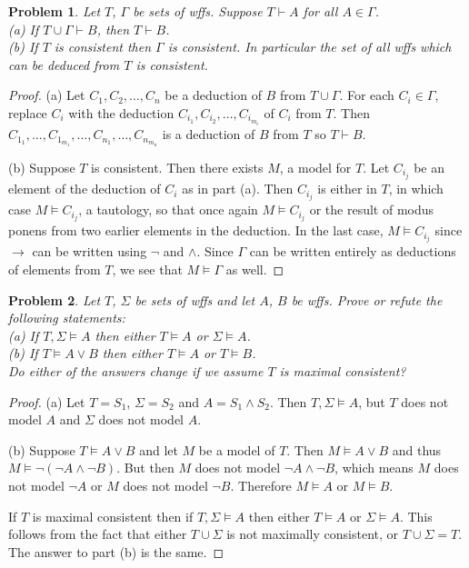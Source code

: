 \documentclass{article}
\newtheorem{problem}{Problem}
\begin{document}
\begin{problem}
Let $T$, $\Gamma$ be sets of wffs. Suppose $T \vdash A$ for all $A \in \Gamma$.\\
(a) If $T \cup \Gamma \vdash B$, then $T \vdash B$.\\
(b) If $T$ is consistent then $\Gamma$ is consistent. In particular the set of all wffs which can be deduced from $T$ is consistent.
\end{problem}
\begin{proof}
(a) Let $C_1, C_2, \dots , C_n$ be a deduction of $B$ from $T \cup \Gamma$. For each $C_i \in \Gamma$, replace $C_i$ with the deduction $C_{i_1}, C_{i_2}, \dots , C_{i_{m_i}}$ of $C_i$ from $T$. Then $C_{1_1}, \dots , C_{1_{m_1}}, \dots , C_{n_1}, \dots , C_{n_{m_n}}$ is a deduction of $B$ from $T$ so $T \vdash B$.

(b) Suppose $T$ is consistent. Then there exists $M$, a model for $T$. Let $C_{i_j}$ be an element of the deduction of $C_i$ as in part (a). Then $C_{i_j}$ is either in $T$, in which case $M \models C_{i_j}$, a tautology, so that once again $M \models C_{i_j}$ or the result of modus ponens from two earlier elements in the deduction. In the last case, $M \models C_{i_j}$ since $\rightarrow$ can be written using $\neg$ and $\wedge$. Since $\Gamma$ can be written entirely as deductions of elements from $T$, we see that $M \models \Gamma$ as well.
\end{proof}

\begin{problem}
Let $T$, $\Sigma$ be sets of wffs and let $A$, $B$ be wffs. Prove or refute the following statements:\\
(a) If $T, \Sigma \models A$ then either $T \models A$ or $\Sigma \models A$.\\
(b) If $T \models A \vee B$ then either $T \models A$ or $T \models B$.\\
Do either of the answers change if we assume $T$ is maximal consistent?
\end{problem}
\begin{proof}
(a) Let $T = S_1$, $\Sigma = S_2$ and $A = S_1 \wedge S_2$. Then $T, \Sigma \models A$, but $T$ does not model $A$ and $\Sigma$ does not model $A$.

(b) Suppose $T \models A \vee B$ and let $M$ be a model of $T$. Then $M \models A \vee B$ and thus $M \models \neg (\neg A \wedge \neg B)$. But then $M$ does not model $\neg A \wedge \neg B$, which means $M$ does not model $\neg A$ or $M$ does not model $\neg B$. Therefore $M \models A$ or $M \models B$.

If $T$ is maximal consistent then if $T, \Sigma \models A$ then either $T \models A$ or $\Sigma \models A$. This follows from the fact that either $T \cup \Sigma$ is not maximally consistent, or $T \cup \Sigma = T$. The answer to part (b) is the same.
\end{proof}
\end{document}
